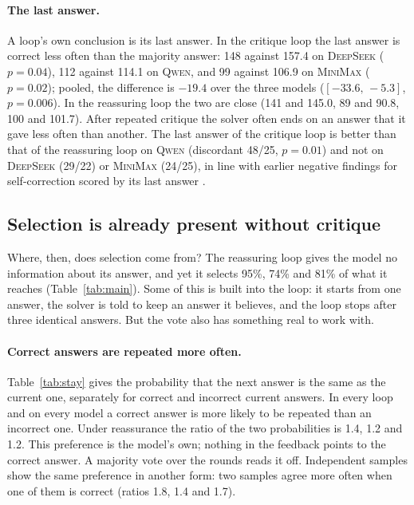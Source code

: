 \documentclass[11pt]{article}
\newcommand{\ds}{\textsc{DeepSeek}}
\newcommand{\qw}{\textsc{Qwen}}
\newcommand{\mm}{\textsc{MiniMax}}
\newcommand{\ci}[2]{$[#1,\,#2]$}
\begin{document}
\paragraph{The last answer.}
A loop's own conclusion is its last answer.
In the critique loop the last answer is correct less often than the majority answer: 148 against 157.4 on \ds{} ($p=0.04$), 112 against 114.1 on \qw, and 99 against 106.9 on \mm{} ($p=0.02$); pooled, the difference is $-19.4$ over the three models (\ci{-33.6}{-5.3}, $p=0.006$).
In the reassuring loop the two are close (141 and 145.0, 89 and 90.8, 100 and 101.7).
After repeated critique the solver often ends on an answer that it gave less often than another.
The last answer of the critique loop is better than that of the reassuring loop on \qw{} (discordant 48/25, $p=0.01$) and not on \ds{} (29/22) or \mm{} (24/25), in line with earlier negative findings for self-correction scored by its last answer \citep{huang2024cannot}.

\subsection{Selection is already present without critique}
\label{sec:mech}

Where, then, does selection come from?
The reassuring loop gives the model no information about its answer, and yet it selects 95\%, 74\% and 81\% of what it reaches (Table~\ref{tab:main}).
Some of this is built into the loop: it starts from one answer, the solver is told to keep an answer it believes, and the loop stops after three identical answers.
But the vote also has something real to work with.

\paragraph{Correct answers are repeated more often.}
Table~\ref{tab:stay} gives the probability that the next answer is the same as the current one, separately for correct and incorrect current answers.
In every loop and on every model a correct answer is more likely to be repeated than an incorrect one.
Under reassurance the ratio of the two probabilities is 1.4, 1.2 and 1.2.
This preference is the model's own; nothing in the feedback points to the correct answer.
A majority vote over the rounds reads it off.
Independent samples show the same preference in another form: two samples agree more often when one of them is correct (ratios 1.8, 1.4 and 1.7).
\end{document}
